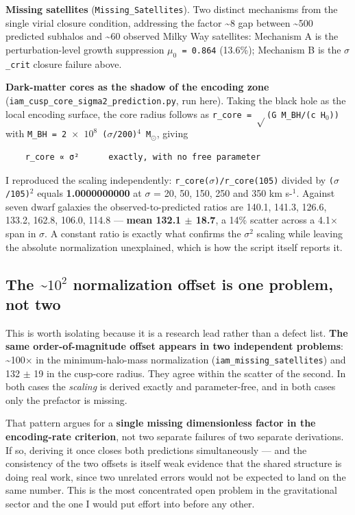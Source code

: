 \documentclass[12pt,a4paper]{article}
\begin{document}
\textbf{Missing satellites} (\texttt{Missing\_Satellites}). Two distinct mechanisms from the single virial closure condition, addressing the factor \textasciitilde{}8 gap between \textasciitilde{}500 predicted subhalos and \textasciitilde{}60 observed Milky Way satellites: Mechanism A is the perturbation-level growth suppression \texttt{$\mu_{0}$ = 0.864} (13.6\%); Mechanism B is the \texttt{$\sigma$\_crit} closure failure above.


\textbf{Dark-matter cores as the shadow of the encoding zone} (\texttt{iam\_cusp\_core\_sigma2\_prediction.py}, run here). Taking the black hole as the local encoding surface, the core radius follows as \texttt{r\_core = $\sqrt{}$(G M\_BH/(c H$_{0}$))} with \texttt{M\_BH = 2 $\times$ $10^{8}$ ($\sigma$/200)$^{4}$ M$_{\odot}$}, giving


\begin{lstlisting}
    r_core ∝ σ²      exactly, with no free parameter
\end{lstlisting}


I reproduced the scaling independently: \texttt{r\_core($\sigma$)/r\_core(105)} divided by \texttt{($\sigma$/105)$^{2}$} equals \textbf{1.0000000000} at $\sigma$ = 20, 50, 150, 250 and 350 km s-$^{1}$. Against seven dwarf galaxies the observed-to-predicted ratios are 140.1, 141.3, 126.6, 133.2, 162.8, 106.0, 114.8 --- \textbf{mean 132.1 $\pm$ 18.7}, a 14\% scatter across a 4.1$\times$ span in $\sigma$. A constant ratio is exactly what confirms the \texttt{$\sigma^{2}$} scaling while leaving the absolute normalization unexplained, which is how the script itself reports it.



\subsection{The \textasciitilde{}$10^{2}$ normalization offset is one problem, not two}

This is worth isolating because it is a research lead rather than a defect list. \textbf{The same order-of-magnitude offset appears in two independent problems}: \textasciitilde{}100$\times$ in the minimum-halo-mass normalization (\texttt{iam\_missing\_satellites}) and 132 $\pm$ 19 in the cusp-core radius. They agree within the scatter of the second. In both cases the \textit{scaling} is derived exactly and parameter-free, and in both cases only the prefactor is missing.


That pattern argues for a \textbf{single missing dimensionless factor in the encoding-rate criterion}, not two separate failures of two separate derivations. If so, deriving it once closes both predictions simultaneously --- and the consistency of the two offsets is itself weak evidence that the shared structure is doing real work, since two unrelated errors would not be expected to land on the same number. This is the most concentrated open problem in the gravitational sector and the one I would put effort into before any other.
\end{document}
